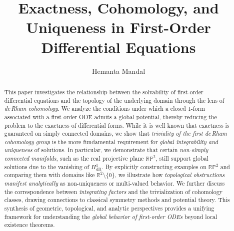 \documentclass{amsart}
\theoremstyle{definition}
\theoremstyle{remark}
\numberwithin{equation}{section}
\begin{document}
\title{Exactness, Cohomology, and Uniqueness in First-Order Differential Equations}

\author{Hemanta Mandal}
\address{Department of Mathematics, C V Raman Global University, Bhubaneswar, Odisha 752054}






\begin{abstract}
This paper investigates the relationship between the solvability of first-order differential equations and the topology of the underlying domain through the lens of \emph{de\,Rham cohomology}. We analyze the conditions under which a closed 1-form associated with a first-order ODE admits a global potential, thereby reducing the problem to the exactness of differential forms. While it is well known that exactness is guaranteed on simply connected domains, we show that \emph{triviality of the first de\,Rham cohomology group} is the more fundamental requirement for \emph{global integrability and uniqueness} of solutions. In particular, we demonstrate that certain \emph{non-simply connected manifolds}, such as the real projective plane $\mathbb{RP}^2$, still support global solutions due to the vanishing of $H^1_{\text{dR}}$. By explicitly constructing examples on $\mathbb{RP}^2$ and comparing them with domains like $\mathbb{R}^2 \setminus \{0\}$, we illustrate how \emph{topological obstructions manifest analytically} as non-uniqueness or multi-valued behavior. We further discuss the correspondence between \emph{integrating factors} and the trivialization of cohomology classes, drawing connections to classical symmetry methods and potential theory. This synthesis of geometric, topological, and analytic perspectives provides a unifying framework for understanding the \emph{global behavior of first-order ODEs} beyond local existence theorems.
\end{abstract}


\maketitle
\end{document}

